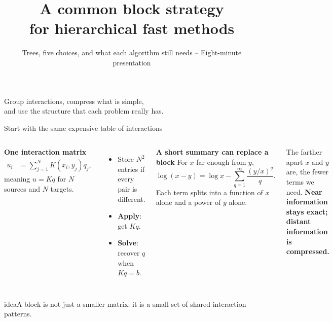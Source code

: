 \documentclass[aspectratio=169,11pt]{beamer}
\title{\Huge A common block strategy\\for hierarchical fast methods}
\subtitle{\large Trees, five choices, and what each algorithm still needs -- Eight-minute presentation}
\author{}
\date{}
\newcommand{\takeaway}[1]{\begin{beamercolorbox}[sep=0.8ex,rounded=true]{idea}\centering\large #1\end{beamercolorbox}}
\begin{document}
\begin{frame}[plain]
\titlepage
\vspace{-2mm}
\centering
\Large Group interactions, compress what is simple,\\and use the structure that each problem really has.
\end{frame}

\begin{frame}{Start with the same expensive table of interactions}
\begin{columns}[T]
  \textbf{One interaction matrix}
  \begin{align*}
    u_i&=\sum_{j=1}^NK(x_i,y_j)q_j,
  \end{align*}
  meaning $u=Kq$ for $N$ sources and $N$ targets.
  \begin{itemize}
    \item Store $N^2$ entries if every pair is different.
    \item \textbf{Apply}: get $Kq$.
    \item \textbf{Solve}: recover $q$ when $Kq=b$.
  \end{itemize}
  \textbf{A short summary can replace a block}
  \vspace{1mm}
  \small
  For $x$ far enough from $y$,
  \begin{equation*}
    \log(x-y)=\log x-\sum_{q=1}^{\infty}\frac{(y/x)^q}{q}.
  \end{equation*}
  Each term splits into a function of $x$ alone and a power of $y$ alone.
  \vspace{1mm}

  The farther apart $x$ and $y$ are, the fewer terms we need. \textbf{Near information stays exact; distant information is compressed.}
\end{columns}
\vspace{2mm}
\takeaway{A block is not just a smaller matrix: it is a small set of shared interaction patterns.}
\end{frame}
\end{document}
